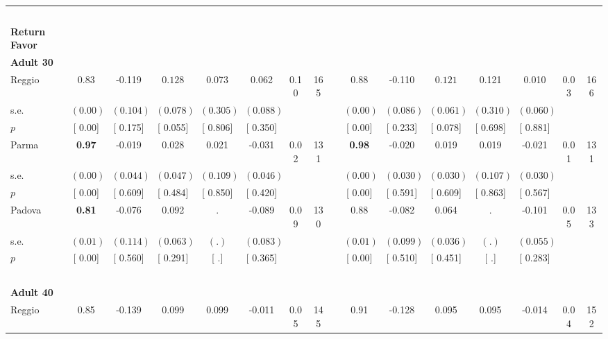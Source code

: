 \begin{longtable}{L{8em} c c c c c c c p{1em} c c c c c c c}
~\\[1em]
\textbf{Return Favor} \\*
\quad \quad \textbf{Adult 30} & & & & & & & & & & & & & & & \\* 
\quad \quad \quad Reggio& 0.83 &    -0.119 & $ \mathbf{    0.128}$ &     0.073 &     0.062 &      0.10 &       165 & & 0.88 &    -0.110 & $ \mathbf{    0.121}$ &     0.121 &     0.010 &      0.03 &       166  \\*
\quad \quad \quad \quad s.e.& $ (     0.00)$ & $ (    0.104)$ & $ (    0.078)$ & $ (    0.305)$ & $ (    0.088)$ & & & & $ (     0.00)$ & $ (    0.086)$ & $ (    0.061)$ & $ (    0.310)$ & $ (    0.060)$ & &  \\*
\quad \quad \quad \quad $ p$ & [     0.00] & [    0.175] & [    0.055] & [    0.806] & [    0.350] & & & & [     0.00] & [    0.233] & [    0.078] & [    0.698] & [    0.881] & &  \\[1em]
\quad \quad \quad Parma& \textbf{     0.97} &    -0.019 &     0.028 &     0.021 &    -0.031 &      0.02 &       131 & & \textbf{     0.98} &    -0.020 &     0.019 &     0.019 &    -0.021 &      0.01 &       131  \\*
\quad \quad \quad \quad s.e.& $ (     0.00)$ & $ (    0.044)$ & $ (    0.047)$ & $ (    0.109)$ & $ (    0.046)$ & & & & $ (     0.00)$ & $ (    0.030)$ & $ (    0.030)$ & $ (    0.107)$ & $ (    0.030)$ & &  \\*
\quad \quad \quad \quad $ p$ & [     0.00] & [    0.609] & [    0.484] & [    0.850] & [    0.420] & & & & [     0.00] & [    0.591] & [    0.609] & [    0.863] & [    0.567] & &  \\[1em]
\quad \quad \quad Padova& \textbf{     0.81} &    -0.076 &     0.092 &         . &    -0.089 &      0.09 &       130 & & 0.88 &    -0.082 &     0.064 &         . &    -0.101 &      0.05 &       133  \\*
\quad \quad \quad \quad s.e.& $ (     0.01)$ & $ (    0.114)$ & $ (    0.063)$ & $ (        .)$ & $ (    0.083)$ & & & & $ (     0.01)$ & $ (    0.099)$ & $ (    0.036)$ & $ (        .)$ & $ (    0.055)$ & &  \\*
\quad \quad \quad \quad $ p$ & [     0.00] & [    0.560] & [    0.291] & [        .] & [    0.365] & & & & [     0.00] & [    0.510] & [    0.451] & [        .] & [    0.283] & &  \\[1em]
~\\[1em]
\quad \quad \textbf{Adult 40} & & & & & & & & & & & & & & & \\* 
\quad \quad \quad Reggio& 0.85 &    -0.139 &     0.099 &     0.099 &    -0.011 &      0.05 &       145 & & 0.91 &    -0.128 &     0.095 &     0.095 &    -0.014 &      0.04 &       152  \\*

\end{longtable}
